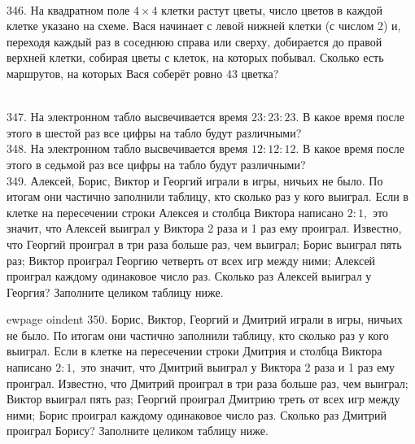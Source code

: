 \begin{figure}[ht!]
\end{figure}\\
346. На квадратном поле $4\times4$ клетки растут цветы, число цветов в каждой клетке указано на схеме. Вася начинает с левой нижней клетки (с числом 2) и, переходя каждый раз в соседнюю справа или сверху, добирается до правой верхней клетки, собирая цветы с клеток, на которых побывал. Сколько есть маршрутов, на которых Вася соберёт ровно 43 цветка?\\
\begin{figure}[ht!]
\end{figure}\\
347. На электронном табло высвечивается время $23:23:23.$ В какое время после этого в шестой раз все цифры на табло будут различными?\\
348. На электронном табло высвечивается время $12:12:12.$ В какое время после этого в седьмой раз все цифры на табло будут различными?\\
349. Алексей, Борис, Виктор и Георгий играли в игры, ничьих не было. По итогам они частично заполнили таблицу, кто сколько раз у кого выиграл. Если в клетке на пересечении строки Алексея и столбца Виктора написано $2:1,$ это значит, что Алексей выиграл у Виктора 2 раза и 1 раз ему проиграл. Известно, что Георгий проиграл в три раза больше раз, чем выиграл; Борис выиграл пять раз; Виктор проиграл Георгию четверть от всех игр между ними; Алексей проиграл каждому одинаковое число раз. Сколько раз Алексей выиграл у Георгия? Заполните целиком таблицу ниже.\\
\begin{figure}[ht!]
\end{figure}
ewpage
oindent
350. Борис, Виктор, Георгий и Дмитрий играли в игры, ничьих не было. По итогам они частично заполнили таблицу, кто сколько раз у кого выиграл. Если в клетке на пересечении строки Дмитрия и столбца Виктора написано $2:1,$ это значит, что Дмитрий выиграл у Виктора 2 раза и 1 раз ему проиграл. Известно, что Дмитрий проиграл в три раза больше раз, чем выиграл; Виктор выиграл пять раз; Георгий проиграл Дмитрию треть от всех игр между ними; Борис проиграл каждому одинаковое число раз. Сколько раз Дмитрий проиграл Борису? Заполните целиком таблицу ниже.\\
\begin{figure}[ht!]
\end{figure}\\
